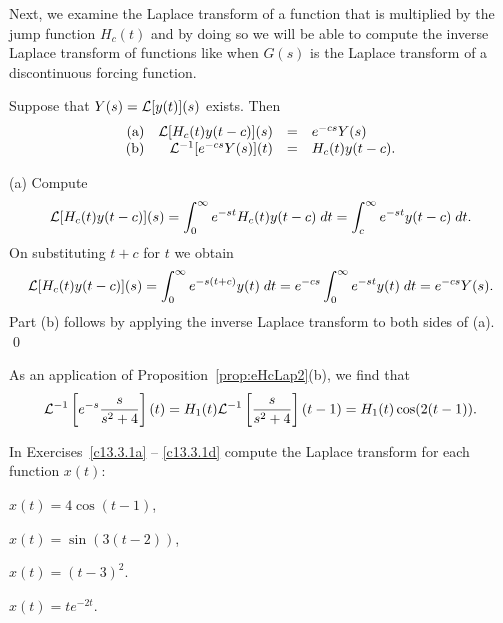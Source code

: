 Next, we examine the Laplace transform of a function that is multiplied 
by the jump function $H_c(t)$ and by doing so we will be able to compute the
inverse Laplace transform of functions like  when $G(s)$ is the 
Laplace transform of a discontinuous forcing function.

\begin{prop}  \label{prop:eHcLap2}
Suppose that $Y(s)={\cal L}[y(t)](s)$ exists.  Then
\[
\begin{array}{rrcl}
\mbox{(a)} & {\cal L}[H_c(t)y(t-c)](s) & = & e^{-cs} Y(s) \\
\mbox{(b)} & {\cal L}^{-1}[e^{-cs}Y(s)](t) & = & H_c(t)y(t-c).
\end{array}
\]
\end{prop}

\proof (a)  Compute
\[
{\cal L}[H_c(t)y(t-c)](s) = \int_0^{\infty} e^{-st}H_c(t) y(t-c)\; dt
= \int_c^{\infty} e^{-st}y(t-c)\; dt.
\]
On substituting $t+c$ for $t$ we obtain
\[
{\cal L}[H_c(t)y(t-c)](s)=\int_0^{\infty} e^{-s(t+c)}y(t)\; dt
=e^{-cs} \int_0^{\infty} e^{-st}y(t)\; dt
=e^{-cs} Y(s).
\]
Part (b) follows by applying the inverse Laplace transform to both sides 
of (a).  \qed

As an application of Proposition~\ref{prop:eHcLap2}(b), we find that
\[
{\cal L}^{-1}\left[ e^{-s}\frac{s}{s^2+4}\right](t)=
H_1(t){\cal L}^{-1}\left[ \frac{s}{s^2+4}\right](t-1)=
H_1(t)\cos(2(t-1)).
\]

\EXER

\TEXER

\noindent In Exercises~\ref{c13.3.1a} -- \ref{c13.3.1d} compute the Laplace 
transform for each function $x(t)$:
\begin{exercise} \label{c13.3.1a}
$x(t) = 4\cos(t-1)$,
\end{exercise}
\begin{exercise} \label{c13.3.1b}
$x(t) = \sin(3(t-2))$,
\end{exercise}
\begin{exercise} \label{c13.3.1c}
$x(t) = (t-3)^2$.
\end{exercise}
\begin{exercise} \label{c13.3.1d}
$x(t) = te^{-2t}$.
\end{exercise}


